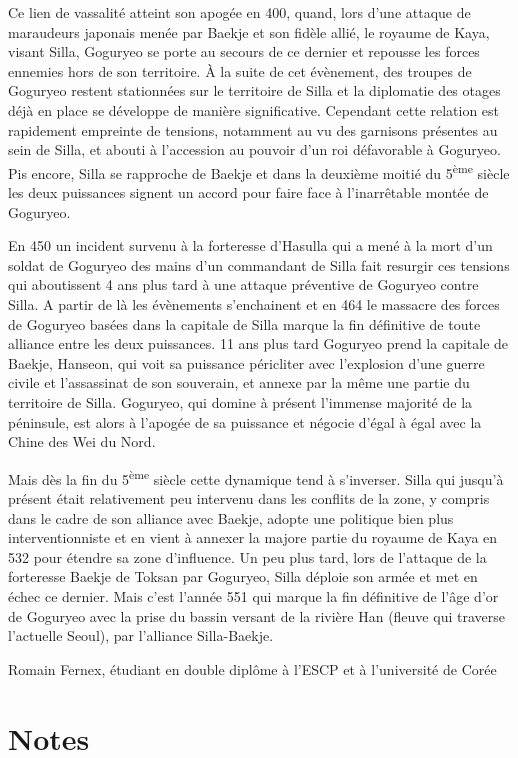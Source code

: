 \documentclass[11pt,a4paper]{article}
\begin{document}
Ce lien de vassalité atteint son apogée en 400, quand, lors d'une attaque de maraudeurs japonais menée par Baekje et son fidèle allié, le royaume de Kaya, visant Silla, Goguryeo se porte au secours de ce dernier et repousse les forces ennemies hors de son territoire. À la suite de cet évènement, des troupes de Goguryeo restent stationnées sur le territoire de Silla et la diplomatie des otages déjà en place se développe de manière significative. Cependant cette relation est rapidement empreinte de tensions, notamment au vu des garnisons présentes au sein de Silla, et abouti à l'accession au pouvoir d'un roi défavorable à Goguryeo. Pis encore, Silla se rapproche de Baekje et dans la deuxième moitié du 5\textsuperscript{ème} siècle les deux puissances signent un accord pour faire face à l'inarrêtable montée de Goguryeo.

En 450 un incident survenu à la forteresse d'Hasulla qui a mené à la mort d'un soldat de Goguryeo des mains d'un commandant de Silla fait resurgir ces tensions qui aboutissent 4 ans plus tard à une attaque préventive de Goguryeo contre Silla. A partir de là les évènements s'enchainent et en 464 le massacre des forces de Goguryeo basées dans la capitale de Silla marque la fin définitive de toute alliance entre les deux puissances. 11 ans plus tard Goguryeo prend la capitale de Baekje, Hanseon, qui voit sa puissance péricliter avec l'explosion d'une guerre civile et l'assassinat de son souverain, et annexe par la même une partie du territoire de Silla. Goguryeo, qui domine à présent l'immense majorité de la péninsule, est alors à l'apogée de sa puissance et négocie d'égal à égal avec la Chine des Wei du Nord.

Mais dès la fin du 5\textsuperscript{ème} siècle cette dynamique tend à s'inverser. Silla qui jusqu'à présent était relativement peu intervenu dans les conflits de la zone, y compris dans le cadre de son alliance avec Baekje, adopte une politique bien plus interventionniste et en vient à annexer la majore partie du royaume de Kaya en 532 pour étendre sa zone d'influence. Un peu plus tard, lors de l'attaque de la forteresse Baekje de Toksan par Goguryeo, Silla déploie son armée et met en échec ce dernier. Mais c'est l'année 551 qui marque la fin définitive de l'âge d'or de Goguryeo avec la prise du bassin versant de la rivière Han (fleuve qui traverse l'actuelle Seoul), par l'alliance Silla-Baekje.

Romain Fernex, étudiant en double diplôme à l'ESCP et à l'université de Corée

\section{Notes}
\end{document}

